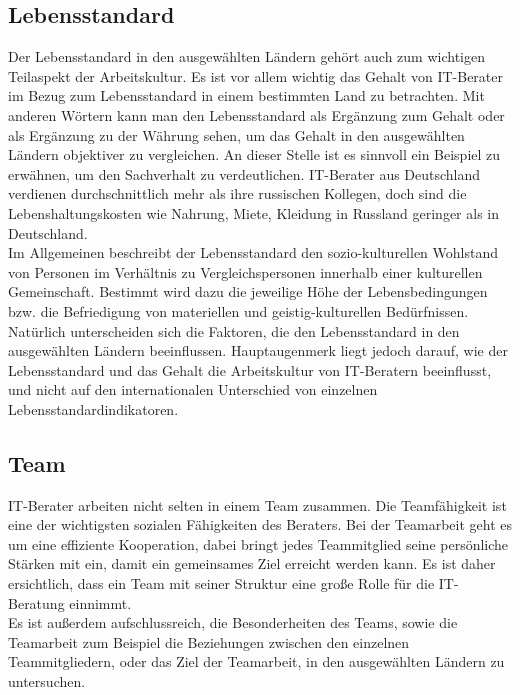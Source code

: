 \subsection*{Lebensstandard}
Der Lebensstandard in den ausgewählten Ländern gehört auch zum wichtigen Teilaspekt der Arbeitskultur. Es ist vor allem wichtig das Gehalt von IT-Berater im Bezug zum Lebensstandard in einem bestimmten Land zu betrachten. Mit anderen Wörtern kann man den Lebensstandard als Ergänzung zum Gehalt oder als Ergänzung zu der Währung sehen, um das Gehalt in den ausgewählten Ländern objektiver zu vergleichen. An dieser Stelle ist es sinnvoll ein Beispiel zu erwähnen, um den Sachverhalt zu verdeutlichen. IT-Berater aus Deutschland verdienen durchschnittlich mehr als ihre russischen Kollegen, doch sind die Lebenshaltungskosten wie Nahrung, Miete, Kleidung in Russland geringer als in Deutschland.\\
Im Allgemeinen beschreibt der Lebensstandard den sozio-kulturellen Wohlstand von Personen im Verhältnis zu Vergleichspersonen innerhalb einer kulturellen Gemeinschaft. Bestimmt wird dazu die jeweilige Höhe der Lebensbedingungen bzw. die Befriedigung von materiellen und geistig-kulturellen Bedürfnissen. \cite{LbsWiki} \\
Natürlich unterscheiden sich die Faktoren, die den Lebensstandard in den ausgewählten Ländern beeinflussen. Hauptaugenmerk liegt jedoch darauf, wie der Lebensstandard und das Gehalt die Arbeitskultur von IT-Beratern beeinflusst, und nicht auf den internationalen Unterschied von einzelnen Lebensstandardindikatoren.
\subsection*{Team}
IT-Berater arbeiten nicht selten in einem Team zusammen. Die Teamfähigkeit ist eine der wichtigsten sozialen Fähigkeiten des Beraters. Bei der Teamarbeit geht es um eine effiziente Kooperation, dabei bringt jedes Teammitglied seine persönliche Stärken mit ein, damit ein gemeinsames Ziel erreicht werden kann. Es ist daher ersichtlich, dass ein Team mit seiner Struktur eine große Rolle für die IT-Beratung einnimmt.\\
Es ist außerdem aufschlussreich, die Besonderheiten des Teams, sowie die Teamarbeit zum Beispiel die Beziehungen zwischen den einzelnen Teammitgliedern, oder das Ziel der Teamarbeit, in den ausgewählten Ländern zu untersuchen.
